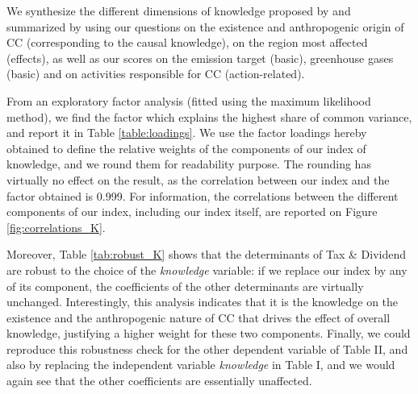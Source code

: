 \documentclass[11pt]{article}
\begin{document}

We synthesize the different dimensions of knowledge proposed by \citet{kiel_einfuhrung_2002} and summarized by \citet{hoppe_what_2018} using our questions on the existence and anthropogenic origin of CC (corresponding to the causal knowledge), on the region most affected (effects), as well as our scores on the emission target (basic), greenhouse gases (basic) and on activities responsible for CC (action-related).


From an exploratory factor analysis (fitted using the maximum likelihood method), we find the factor which explains the highest share of common variance, and report it in Table \ref{table:loadings}. We use the factor loadings hereby obtained to define the relative weights of the components of our index of knowledge, and we round them for readability purpose. The rounding has virtually no effect on the result, as the correlation between our index and the factor obtained is 0.999. For information, the correlations between the different components of our index, including our index itself, are reported on Figure \ref{fig:correlations_K}.

Moreover, Table \ref{tab:robust_K} shows that the determinants of Tax \& Dividend are robust to the choice of the \textit{knowledge} variable: if we replace our index by any of its component, the coefficients of the other determinants are virtually unchanged. Interestingly, this analysis indicates that it is the knowledge on the existence and the anthropogenic nature of CC that drives the effect of overall knowledge, justifying a higher weight for these two components. Finally, we could reproduce this robustness check for the other dependent variable of Table II, and also by replacing the independent variable \textit{knowledge} in Table I, and we would again see that the other coefficients are essentially unaffected.
\end{document}
